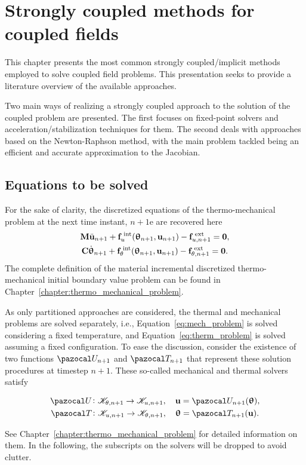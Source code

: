 \chapter {Strongly coupled methods for coupled fields}

This chapter presents the most common strongly coupled/implicit methods employed to solve coupled field problems.
This presentation seeks to provide a literature overview of the available approaches.

Two main ways of realizing a strongly coupled approach to the solution of the coupled problem are presented.
The first focuses on fixed-point solvers and acceleration/stabilization techniques for them.
The second deals with approaches based on the Newton-Raphson method, with the main problem tackled being an efficient and accurate approximation to the Jacobian.

\section{Equations to be solved}

For the sake of clarity, the discretized equations of the thermo-mechanical problem at the next time instant, \(n+1\)e are recovered here
\begin{gather}
    \mathbf M \ddot{\mathbf u}_{n+1} +\mathbf f_u^\text{\;int}(\bm \uptheta_{n+1}, \mathbf u_{n+1})-\mathbf f^\text{\;ext}_{u,n+1}=\mathbf 0, \label{eq:mech_problem} \\
    \mathbf C \dot{\bm \uptheta}_{n+1} +\mathbf f_\theta^\text{\;int}(\bm \uptheta_{n+1}, \mathbf u_{n+1})-\mathbf f^\text{\;ext}_{\theta,n+1}=\mathbf 0. \label{eq:therm_problem}
\end{gather}
The complete definition of the material incremental discretized thermo-mechanical initial boundary value problem can be found in Chapter~\ref{chapter:thermo_mechanical_problem}.

As only partitioned approaches are considered, the thermal and mechanical problems are solved separately, i.e., Equation~\eqref{eq:mech_problem} is solved considering a fixed temperature, and Equation~\eqref{eq:therm_problem} is solved assuming a fixed configuration.
To ease the discussion, consider the existence of two functions \(\pazocal U_{n+1}\) and \(\pazocal T_{n+1}\) that represent these solution procedures at timestep \(n+1\).
These so-called mechanical and thermal solvers satisfy
\begin{highlight}[innertopmargin=-5pt]
\begin{gather}
  \pazocal U\colon \mathscr K_{\theta, n+1}\to \mathscr K_{u,n+1},\quad \mathbf u = \pazocal U_{n+1}(\bm \uptheta),\\
  \pazocal T\colon \mathscr K_{u,n+1}\to \mathscr K_{\theta, n+1},\quad \bm \uptheta = \pazocal T_{n+1}(\mathbf u).
\end{gather}
\end{highlight}
See Chapter~\ref{chapter:thermo_mechanical_problem} for detailed information on them.
In the following, the subscripts on the solvers will be dropped to avoid clutter.

